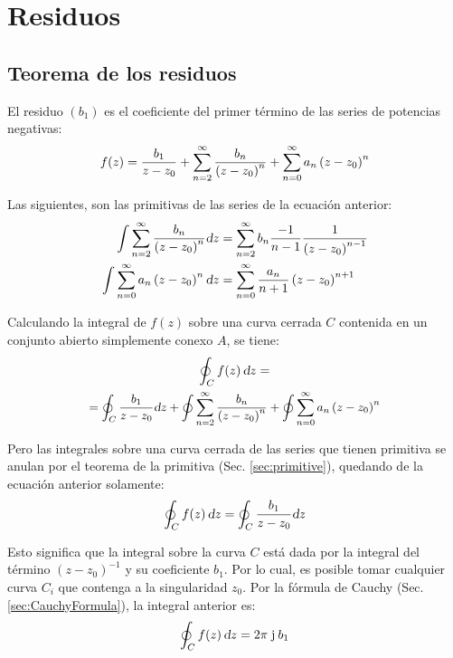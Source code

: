 \documentclass[a5paper,12pt,twoside]{book}
\begin{document}
\chapter{Residuos}


\section{Teorema de los residuos}
\label{sec:residue}

El residuo $(b_1)$ es el coeficiente del primer término de las series de potencias negativas:
\begin{equation*}
    f(z) = \frac{b_1}{z-z_0} + \sum_{n=2}^\infty \frac{b_n}{\left(z-z_0\right)^n} + \sum_{n=0}^\infty a_n \left(z-z_0\right)^n
\end{equation*}

Las siguientes, son las primitivas de las series de la ecuación anterior:
\begin{align*}
    \int \sum_{n=2}^\infty \frac{b_n}{\left(z-z_0\right)^n} \textsl{d} z
    &= \sum_{n=2}^\infty b_n \frac{-1}{n-1} \frac{1}{\left(z-z_0\right)^{n-1}}
    \\
    \int \sum_{n=0}^\infty a_n \left(z-z_0\right)^n \textsl{d} z
    &= \sum_{n=0}^\infty \frac{a_n}{n+1} \left(z-z_0\right)^{n+1}
\end{align*}

Calculando la integral de $f(z)$ sobre una curva cerrada $C$ contenida en un conjunto abierto simplemente conexo $A$, se tiene:
\begin{multline*}
    \oint_C f(z) \, \dif z =
    \\
    \scale{0.96}{
    = \oint_C \frac{b_1}{z-z_0} \dif z + \oint \sum_{\nth=2}^\infty \frac{b_\nth}{\left(z-z_0\right)^n} + \oint \sum_{\nth=0}^\infty a_\nth \left(z-z_0\right)^\nth
    }
\end{multline*}

Pero las integrales sobre una curva cerrada de las series que tienen primitiva se anulan por el teorema de la primitiva (Sec. \ref{sec:primitive}), quedando de la ecuación anterior solamente:
\begin{equation*}
    \oint_C f(z) \, \textsl{d} z = \oint_C \frac{b_1}{z-z_0} \textsl{d} z
\end{equation*}

Esto significa que la integral sobre la curva $C$ está dada por la integral del término $(z-z_0)^{-1}$ y su coeficiente $b_1$.
Por lo cual, es posible tomar cualquier curva $C_i$ que contenga a la singularidad $z_0$.
Por la fórmula de Cauchy (Sec. \ref{sec:CauchyFormula}), la integral anterior es:
\begin{equation*}
    \oint_C f(z) \, \textsl{d} z = 2 \pi \, \mkern2mu\mathrm{j}\mkern1mu \, b_1
\end{equation*}
\end{document}
